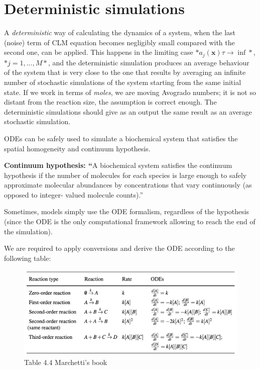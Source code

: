 \graphicspath{{chapters/05/}}
\chapter{Deterministic simulations}

A \emph{deterministic} way of calculating the dynamics of a system, when
the last (noise) term of CLM equation becomes negligibly small compared
with the second one, can be applied. This happens in the limiting case
$*a_j(\mathbf{x})\tau → \inf*$, $*j = 1,...,M*$, and the deterministic
simulation produces an average behaviour of the system that is very
close to the one that results by averaging an infinite number of
stochastic simulations of the system starting from the same initial
state. If we work in terms of \emph{moles}, we are moving Avogrado
numbers; it is not so distant from the reaction size, the assumption is
correct enough. The deterministic simulations should give as an output
the same result as an average stochastic simulation.

ODEs can be safely used to simulate a biochemical system that satisfies
the spatial homogeneity and continuum hypothesis.

\textbf{Continuum hypothesis: ``}A biochemical system satisfies the
continuum hypothesis if the number of molecules for each species is
large enough to safely approximate molecular abundances by
concentrations that vary continuously (as opposed to integer- valued
molecule counts).''

Sometimes, models simply use the ODE formalism, regardless of the
hypothesis (since the ODE is the only computational framework allowing
to reach the end of the simulation).

We are required to apply conversions and derive the ODE according to the
following table:

\begin{figure}
\centering
\includegraphics{05_images/reaction_ODEs.png}
\caption{Table 4.4 Marchetti's book}
\end{figure}

